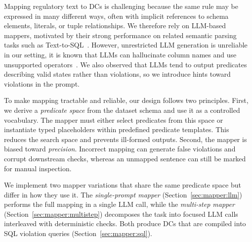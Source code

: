 Mapping regulatory text to DCs is challenging because the same rule may be expressed in many different ways, often with implicit references to schema elements, literals, or tuple relationships. 
We therefore rely on LLM-based mappers, motivated by their strong performance on related semantic parsing tasks such as Text-to-SQL~\cite{llmTEXT2SQLSurvey2025}. However, unrestricted LLM generation is unreliable in our setting, it is known that LLMs  can hallucinate column names and use unsupported operators~\cite{dail2025,llmTEXT2SQLSurvey2025,DBLP:conf/dexa/DociniAO25}. 
We also observed that LLMs tend to output predicates describing valid states rather than violations, so we introduce hints toward violations in the prompt.

To make mapping tractable and reliable, our design follows two principles. First, we derive a \emph{predicate space} from the dataset schema and use it as a controlled vocabulary. The mapper must either select predicates from this space or instantiate typed placeholders within predefined predicate templates. This reduces the search space and prevents ill-formed outputs. Second, the mapper is biased toward \emph{precision}. Incorrect mapping can generate false violations and corrupt downstream checks, whereas an unmapped sentence can still be marked for manual inspection.

We implement two mapper variations that share the same predicate space but differ in how they use it. The \emph{single-prompt mapper} (Section~\ref{sec:mapper:llm}) performs the full mapping in a single LLM call, while the \emph{multi-step mapper} (Section~\ref{sec:mapper:multistep}) decomposes the task into focused LLM calls interleaved with deterministic checks. Both produce DCs that are compiled into SQL violation queries (Section~\ref{sec:mapper:sql}).


